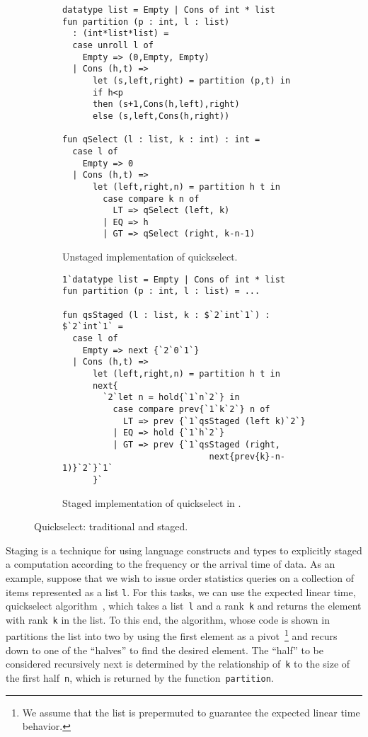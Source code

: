 \begin{figure*}
\begin{subfigure}{0.5\textwidth}
\begin{lstlisting} 
datatype list = Empty | Cons of int * list
fun partition (p : int, l : list) 
  : (int*list*list) =
  case unroll l of 
    Empty => (0,Empty, Empty) 
  | Cons (h,t) =>
      let (s,left,right) = partition (p,t) in
      if h<p 
      then (s+1,Cons(h,left),right)
      else (s,left,Cons(h,right))

fun qSelect (l : list, k : int) : int = 
  case l of
    Empty => 0
  | Cons (h,t) => 
      let (left,right,n) = partition h t in
        case compare k n of
          LT => qSelect (left, k)
        | EQ => h
        | GT => qSelect (right, k-n-1)
\end{lstlisting}
\caption{Unstaged implementation of quickselect.}
\label{fig:quickselect}
\label{fig:qs-unstaged}
\end{subfigure}%
\begin{subfigure}{0.5\textwidth}
\begin{lstlisting} 
1`datatype list = Empty | Cons of int * list
fun partition (p : int, l : list) = ...

fun qsStaged (l : list, k : $`2`int`1`) : $`2`int`1` = 
  case l of
    Empty => next {`2`0`1`}
  | Cons (h,t) => 
      let (left,right,n) = partition h t in
      next{
        `2`let n = hold{`1`n`2`} in
          case compare prev{`1`k`2`} n of
            LT => prev {`1`qsStaged (left k)`2`}
          | EQ => hold {`1`h`2`}
          | GT => prev {`1`qsStaged (right, 
                             next{prev{k}-n-1)}`2`}`1`
      }`
\end{lstlisting}
\caption{Staged implementation of quickselect in \lang.}
\label{fig:qsstaged}
\label{fig:qs-staged}
\end{subfigure}
\caption{Quickselect: traditional and staged.}
\end{figure*}


Staging is a technique for using language constructs and types to
explicitly staged a computation according to the frequency or the
arrival time of data.  As an example, suppose that we wish to issue
order statistics queries on a collection of items represented as a
list \texttt{l}.  For this tasks, we can use the expected linear time,
quickselect algorithm~\cite{quickselect}, which takes a
list~\texttt{l} and a rank~\texttt{k} and returns the element with
rank~\texttt{k} in the list.  To this end, the algorithm, whose code
is shown in ~ partitions the list into two by
using the first element as a pivot~\footnote{We assume that the list
  is prepermuted to guarantee the expected linear time behavior.} and
recurs down to one of the ``halves'' to find the desired element.  The
``half'' to be considered recursively next is determined by the
relationship of~\texttt{k} to the size of the first half~\texttt{n},
which is returned by the function~\texttt{partition}.

